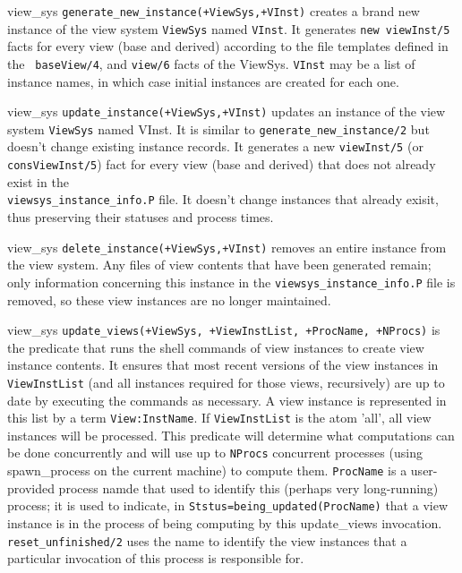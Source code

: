 \begin{description}

{view\_sys}
%
{\tt generate\_new\_instance(+ViewSys,+VInst)} creates a brand new
instance of the view system {\tt ViewSys} named {\tt VInst}.  It
generates {\tt new\ viewInst/5} facts for every view (base and
derived) according to the file templates defined in the {\tt
  baseView/4}, and {\tt view/6} facts of the ViewSys.  {\tt VInst} may
be a list of instance names, in which case initial instances are
created for each one.

{view\_sys}
{\tt update\_instance(+ViewSys,+VInst)} updates an instance of the
view system {\tt ViewSys} named VInst.  It is similar to
{\tt generate\_new\_instance/2} but doesn't change existing instance
records.  It generates a new {\tt viewInst/5} (or
{\tt consViewInst/5}) fact for every view (base and derived) that
does not already exist in the \\
{\tt viewsys\_instance\_info.P} file.  It
doesn't change instances that already exisit, thus preserving their
statuses and process times.  

{view\_sys}
%
{\tt delete\_instance(+ViewSys,+VInst)} removes an entire instance
from the view system.  Any files of view contents that have been
generated remain; only information concerning this instance in the
{\tt viewsys\_instance\_info.P} file is removed, so these view
instances are no longer maintained.

{view\_sys}
{\tt update\_views(+ViewSys, +ViewInstList, +ProcName, +NProcs)} is
the predicate that runs the shell commands of view instances to create
view instance contents.  It ensures that most recent versions of the
view instances in {\tt ViewInstList} (and all instances required for those
views, recursively) are up to date by executing the commands as
necessary.  A view instance is represented in this list by a term
{\tt View:InstName}.  If {\tt ViewInstList} is the atom 'all', all
view instances will be processed.  This predicate will determine what
computations can be done concurrently and will use up to {\tt NProcs}
concurrent processes (using spawn\_process on the current machine) to
compute them.  {\tt ProcName} is a user-provided process namde that
used to identify this (perhaps very long-running) process; it is used
to indicate, in {\tt Ststus=being\_updated(ProcName)} that a view
instance is in the process of being computing by this update\_views
invocation.  {\tt reset\_unfinished/2} uses the name to identify the
view instances that a particular invocation of this process is
responsible for.  


\end{description}

